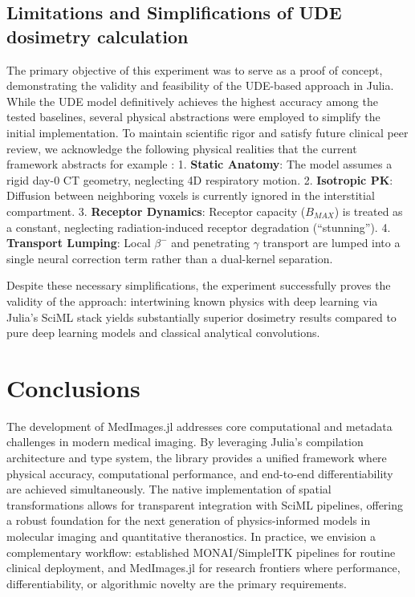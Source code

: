 \documentclass[a4paper,10pt]{elsarticle}
\begin{document}
\subsection{Limitations and Simplifications of UDE dosimetry calculation}
The primary objective of this experiment was to serve as a proof of concept, demonstrating the validity and feasibility of the UDE-based approach in Julia. While the UDE model definitively achieves the highest accuracy among the tested baselines, several physical abstractions were employed to simplify the initial implementation. To maintain scientific rigor and satisfy future clinical peer review, we acknowledge the following physical realities that the current framework abstracts for example :
1. \textbf{Static Anatomy}: The model assumes a rigid day-0 CT geometry, neglecting 4D respiratory motion.
2. \textbf{Isotropic PK}: Diffusion between neighboring voxels is currently ignored in the interstitial compartment.
3. \textbf{Receptor Dynamics}: Receptor capacity ($B_{MAX}$) is treated as a constant, neglecting radiation-induced receptor degradation (``stunning'').
4. \textbf{Transport Lumping}: Local $\beta^-$ and penetrating $\gamma$ transport are lumped into a single neural correction term rather than a dual-kernel separation.

Despite these necessary simplifications, the experiment successfully proves the validity of the approach: intertwining known physics with deep learning via Julia's SciML stack yields substantially superior dosimetry results compared to pure deep learning models and classical analytical convolutions.


\section{Conclusions}
The development of MedImages.jl addresses core computational and metadata challenges in modern medical imaging. By leveraging Julia's compilation architecture and type system, the library provides a unified framework where physical accuracy, computational performance, and end-to-end differentiability are achieved simultaneously. The native implementation of spatial transformations allows for transparent integration with SciML pipelines, offering a robust foundation for the next generation of physics-informed models in molecular imaging and quantitative theranostics.
In practice, we envision a complementary workflow: established MONAI/SimpleITK pipelines for routine clinical deployment, and MedImages.jl for research frontiers where performance, differentiability, or algorithmic novelty are the primary requirements.
\end{document}
